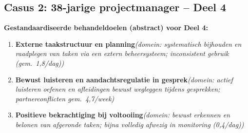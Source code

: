 \documentclass[11pt,a4paper]{article}
\begin{document}
\vspace{0.6em}
\newpage
\subsection*{Casus 2: 38-jarige projectmanager -- Deel 4}

\begin{contextbox}
\small\textbf{Gestandaardiseerde behandeldoelen (abstract) voor Deel 4:}
\begin{enumerate}[topsep=2pt,itemsep=1pt,label=\arabic*.]
\item \textbf{Externe taakstructuur en planning}\quad\textit{\small (domein: systematisch bijhouden en raadplegen van taken via een extern beheersysteem; inconsistent gebruik (gem.\ 1,8/dag))}
\item \textbf{Bewust luisteren en aandachtsregulatie in gesprek}\quad\textit{\small (domein: actief luisteren oefenen en afleidingen bewust wegleggen tijdens gesprekken; partnerconflicten gem.\ 4,7/week)}
\item \textbf{Positieve bekrachtiging bij voltooiing}\quad\textit{\small (domein: bewust erkennen en belonen van afgeronde taken; bijna volledig afwezig in monitoring (0,4/dag))}
\end{enumerate}
\end{contextbox}
\end{document}
